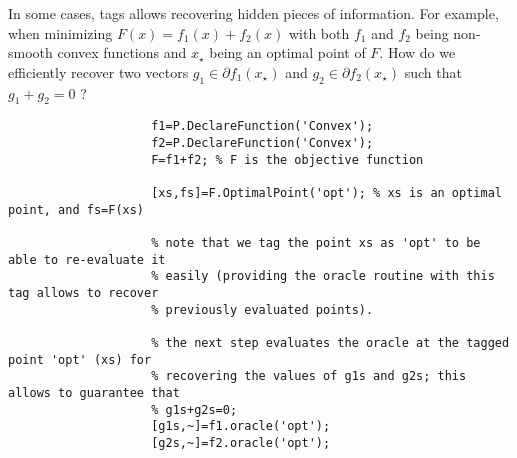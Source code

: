 \documentclass[11pt,a4paper]{article}
\begin{document}
					
					In some cases, tags allows recovering hidden pieces of information. For example, when minimizing $F(x)=f_1(x)+f_2(x)$ with both $f_1$ and $f_2$ being non-smooth convex functions and $x_\star$ being an optimal point of $F$.  How do we efficiently recover two vectors $g_1\in\partial f_1(x_\star)$ and $g_2\in\partial f_2(x_\star)$ such that $g_1+g_2=0$ ?\\[-1cm]
					\begin{lstlisting}
					f1=P.DeclareFunction('Convex');
					f2=P.DeclareFunction('Convex');
					F=f1+f2; % F is the objective function
					
					[xs,fs]=F.OptimalPoint('opt'); % xs is an optimal point, and fs=F(xs)
					
					% note that we tag the point xs as 'opt' to be able to re-evaluate it
					% easily (providing the oracle routine with this tag allows to recover
					% previously evaluated points).
					
					% the next step evaluates the oracle at the tagged point 'opt' (xs) for
					% recovering the values of g1s and g2s; this allows to guarantee that
					% g1s+g2s=0;
					[g1s,~]=f1.oracle('opt');
					[g2s,~]=f2.oracle('opt');
					\end{lstlisting}
					
\end{document}
